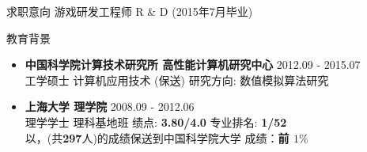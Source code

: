 \documentclass{resume} %
\begin{document}
 
\begin{rSection}{求职意向} 
 游戏研发工程师 R \& D (2015年7月毕业) 
\end{rSection} 

\begin{rSection}{教育背景} 
\begin{itemize} 
  \setlength{\itemsep}{0pt} %
  \setlength{\parsep}{0pt} %
  \setlength{\parskip}{0pt} %
\item {\bf 中国科学院计算技术研究所 高性能计算机研究中心} \hfill {2012.09 - 2015.07} \\ 
工学硕士   计算机应用技术 (保送) \hfill 研究方向: 数值模拟算法研究 
\vspace{1mm}
\item {\bf 上海大学 理学院} \hfill {2008.09 - 2012.06} \\ 
理学学士   理科基地班  \hfill 绩点: {\bf 3.80/4.0} 专业排名: {\bf 1/52}\\
以{}，{}(共{\bf297}人)的成绩保送到中国科学院大学 {\hfill}成绩：{\bf 前 $1\%$}
\end{itemize}
\end{rSection}

\end{document}
